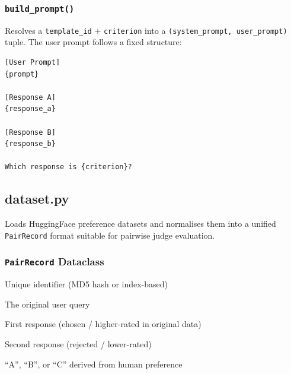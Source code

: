 \documentclass[11pt,a4paper]{article}
\begin{document}
\subsubsection*{\texttt{build\_prompt()}}

Resolves a \texttt{template\_id} + \texttt{criterion} into a
\texttt{(system\_prompt, user\_prompt)} tuple. The user prompt follows a
fixed structure:

\begin{codebox}
\begin{lstlisting}
[User Prompt]
{prompt}

[Response A]
{response_a}

[Response B]
{response_b}

Which response is {criterion}?
\end{lstlisting}
\end{codebox}


\subsection{dataset.py}

\begin{modulebox}
Loads HuggingFace preference datasets and normalises them into a unified
\texttt{PairRecord} format suitable for pairwise judge evaluation.
\end{modulebox}

\subsubsection*{\texttt{PairRecord} Dataclass}

\begin{description}[style=nextline, leftmargin=1.5cm, nosep]
  \item[\texttt{prompt\_id}] Unique identifier (MD5 hash or index-based)
  \item[\texttt{prompt}] The original user query
  \item[\texttt{response\_a}] First response (chosen / higher-rated in original data)
  \item[\texttt{response\_b}] Second response (rejected / lower-rated)
  \item[\texttt{gold\_label}] ``A'', ``B'', or ``C'' derived from human preference
\end{description}
\end{document}
